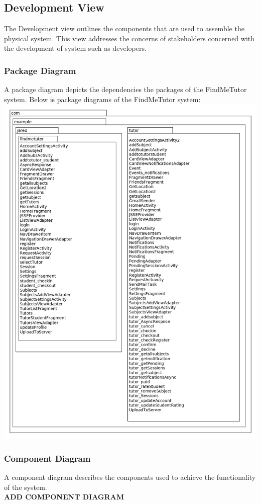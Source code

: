 \documentclass[12pt]{article}
\begin{document}
\subsection{Development View}
The Development view outlines the components that are used to assemble the physical system.
This view addresses the concerns of stakeholders concerned with the development of system such as developers.\\
\subsubsection{Package Diagram}

A package diagram depicts the dependencies the packages of the FindMeTutor system.
Below is package diagrams of the FindMeTutor system:\\
\includegraphics[width=140mm]{./package_diagram/package_diagram.png}


\subsubsection{Component Diagram}
A component diagram describes the components used to achieve the functionality of the system.\\
\textbf{ADD COMPONENT DIAGRAM}
\end{document}
